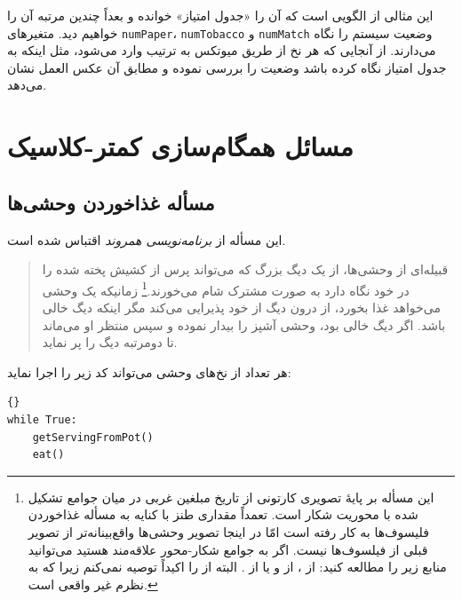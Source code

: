 \documentclass{book}
\newcommand{\clearemptydoublepage}{}%
\begin{document}
    این مثالی از الگویی است که آن را «جدول امتیاز» خوانده و بعداً چندین مرتبه آن را خواهیم دید.   
    متغیرهای     {\tt numPaper}، {\tt numTobacco} و  {\tt numMatch}    وضعیت سیستم را نگاه می‌دارند. 
    از آنجایی که هر نخ از طریق میوتکس به ترتیب وارد می‌شود، مثل اینکه به جدول امتیاز نگاه کرده باشد وضعیت را بررسی نموده و مطابق آن عکس العمل نشان می‌دهد. 



\clearemptydoublepage
\chapter{مسائل همگام‌سازی کمتر-کلاسیک}
\label{next}


\section{مسأله غذاخوردن وحشی‌ها}

    این مسأله از  \emph{برنامه‌نویسی همروند}   اقتباس شده است\cite{andrews}. 

\begin {quotation}
    قبیله‌ای از وحشی‌ها، از یک دیگ بزرگ که می‌تواند   
    پرس از کشیش پخته شده را در خود نگاه دارد به صورت مشترک شام می‌خورند.\footnote{%
    این مسأله بر پایهٔ تصویری کارتونی از تاریخ مبلغین غربی در میان جوامع تشکیل شده با محوریت شکار است. 
    تعمداً مقداری طنز با کنایه به مسأله غذاخوردن فلیسوف‌ها به کار رفته است 
    امّا در اینجا تصویر وحشی‌ها واقع‌بینانه‌تر از تصویر قبلی از فیلسوف‌ها نیست. 
    اگر به جوامع شکار-محور علاقه‌مند هستید می‌توانید منابع زیر را مطالعه کنید:
     از ،
     از  و یا 
     از .
    البته  از  را اکیداً توصیه نمی‌کنم زیرا که به نظرم غیر واقعی است.}
    زمانیکه یک وحشی می‌خواهد غذا بخورد، از درون دیگ از خود پذیرایی می‌کند مگر اینکه دیگ خالی باشد. 
    اگر دیگ خالی بود، وحشی آشپز را بیدار نموده و سپس منتظر او می‌ماند تا دومرتبه دیگ را پر نماید.
\end{quotation}

    هر تعداد از نخ‌های وحشی می‌تواند کد زیر را اجرا نماید:

\begin{latin}
\begin{lstlisting}[title=\rl{کد ناهمگام یک وحشی}]{}
while True:
    getServingFromPot()
    eat()
\end{lstlisting}
\end{latin}
\end{document}
